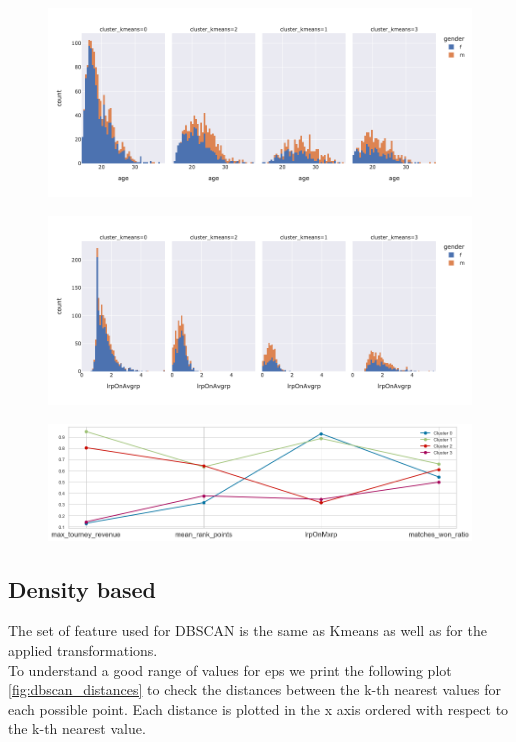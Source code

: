 \begin{figure}
\centering
\begin{minipage}{.5\textwidth}
\centering
\includegraphics[width=\textwidth]{plots/kmeans/hist_age.png}
\label{fig:age_kmeans}
\end{minipage}%
\begin{minipage}{.5\textwidth}
\centering
\includegraphics[width=\textwidth]{plots/kmeans/hist_lrpOnAvgrp.png}
\label{fig:lrpOnAvgrp_kmeans}
\end{minipage}
\end{figure}

\begin{figure}[h]
\centering
\includegraphics[width=\textwidth]{plots/kmeans/kmeans_results}
\label{fig:kmeans_results}
\end{figure}



\newpage

\subsection{Density based}
The set of feature used for DBSCAN is the same as Kmeans as well as for the applied transformations.\\
To understand a good range of values for eps we print the following plot \ref{fig:dbscan_distances} to check the distances between the k-th nearest values for each possible point. Each distance is plotted in the x axis ordered with respect to the k-th nearest value.

